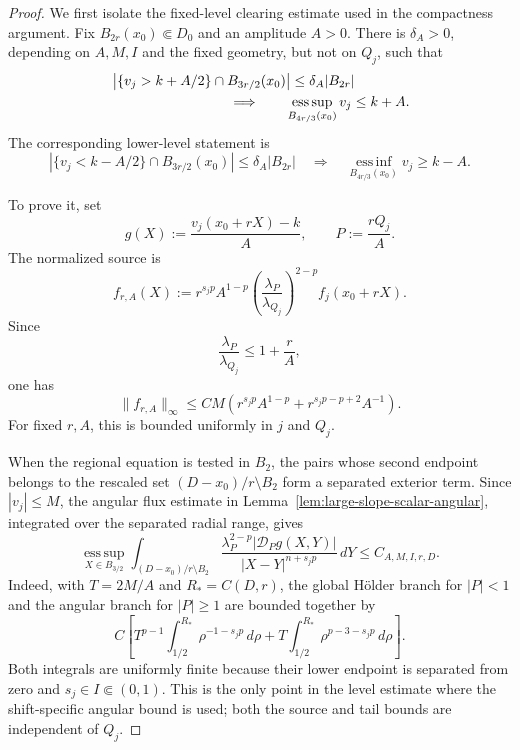 \documentclass[11pt,reqno]{amsart}
\numberwithin{equation}{section}
\newcommand{\dd}{\,d}
\theoremstyle{remark}
\begin{document}
\begin{proof}
We first isolate the fixed-level clearing estimate used in the
compactness argument.  Fix
\(B_{2r}(x_0)\Subset D_0\) and an amplitude \(A>0\).  There is
\(\delta_A>0\), depending on \(A,M,I\) and the fixed geometry, but not
on \(Q_j\), such that
\begin{equation}
 \begin{split}
 &\left|\{v_j>k+A/2\}\cap B_{3r/2}(x_0)\right|
 \le\delta_A|B_{2r}|\\
 &\hspace{30mm}\Longrightarrow\qquad
 \operatorname*{ess\,sup}_{B_{4r/3}(x_0)}v_j\le k+A.
 \end{split}
 \label{eq:fixed-level-clearing}
\end{equation}
The corresponding lower-level statement is
\[
 \left|\{v_j<k-A/2\}\cap B_{3r/2}(x_0)\right|
 \le\delta_A|B_{2r}|
 \quad\Longrightarrow\quad
 \operatorname*{ess\,inf}_{B_{4r/3}(x_0)}v_j\ge k-A.
\]

To prove it, set
\[
 g(X):=\frac{v_j(x_0+rX)-k}{A},
 \qquad P:=\frac{rQ_j}{A}.
\]
The normalized source is
\[
 f_{r,A}(X)
 :=r^{s_jp}A^{1-p}
 \left(\frac{\lambda_P}{\lambda_{Q_j}}\right)^{2-p}
 f_j(x_0+rX).
\]
Since
\[
 \frac{\lambda_P}{\lambda_{Q_j}}\le1+\frac rA,
\]
one has
\begin{equation}
 \|f_{r,A}\|_\infty
 \le C M\left(r^{s_jp}A^{1-p}
              +r^{s_jp-p+2}A^{-1}\right).
 \label{eq:fixed-level-scaled-source}
\end{equation}
For fixed \(r,A\), this is bounded uniformly in \(j\) and \(Q_j\).

When the regional equation is tested in \(B_2\), the pairs whose second
endpoint belongs to the rescaled set
\((D-x_0)/r\setminus B_2\) form a separated exterior term.  Since
\(|v_j|\le M\), the angular flux estimate in
Lemma~\ref{lem:large-slope-scalar-angular}, integrated over the
separated radial range, gives
\begin{equation}
 \operatorname*{ess\,sup}_{X\in B_{3/2}}
 \int_{(D-x_0)/r\setminus B_2}
 \frac{\lambda_P^{2-p}|\mathcal D_Pg(X,Y)|}
 {|X-Y|^{n+s_jp}}\dd Y
 \le C_{A,M,I,r,D}.
 \label{eq:fixed-level-regional-tail}
\end{equation}
Indeed, with \(T=2M/A\) and \(R_*=C(D,r)\), the global H\"older
branch for \(|P|<1\) and the angular branch for \(|P|\ge1\) are
bounded together by
\[
 C\left[
 T^{p-1}\int_{1/2}^{R_*}\rho^{-1-s_jp}\dd\rho
 +T\int_{1/2}^{R_*}\rho^{p-3-s_jp}\dd\rho\right].
\]
Both integrals are uniformly finite because their lower endpoint is
separated from zero and \(s_j\in I\Subset(0,1)\).
This is the only point in the level estimate where the shift-specific
angular bound is used; both the source and tail bounds are independent
of \(Q_j\).


\end{proof}
\end{document}
